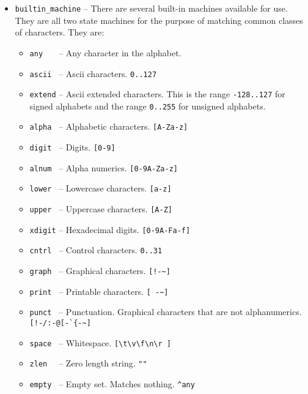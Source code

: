\documentclass[letterpaper,11pt,oneside]{book}
\begin{document}
\begin{itemize}
\item \verb|builtin_machine| -- There are several built-in machines available
for use. They are all two state machines for the purpose of matching common
classes of characters. They are:

\begin{itemize}

\item \verb|any   | -- Any character in the alphabet.

\item \verb|ascii | -- Ascii characters. \verb|0..127|

\item \verb|extend| -- Ascii extended characters. This is the range
\verb|-128..127| for signed alphabets and the range \verb|0..255| for unsigned
alphabets.

\item \verb|alpha | -- Alphabetic characters. \verb|[A-Za-z]|

\item \verb|digit | -- Digits. \verb|[0-9]|

\item \verb|alnum | -- Alpha numerics. \verb|[0-9A-Za-z]|

\item \verb|lower | -- Lowercase characters. \verb|[a-z]|

\item \verb|upper | -- Uppercase characters. \verb|[A-Z]|

\item \verb|xdigit| -- Hexadecimal digits. \verb|[0-9A-Fa-f]|

\item \verb|cntrl | -- Control characters. \verb|0..31|

\item \verb|graph | -- Graphical characters. \verb|[!-~]|

\item \verb|print | -- Printable characters. \verb|[ -~]|

\item \verb|punct | -- Punctuation. Graphical characters that are not alphanumerics.
\verb|[!-/:-@[-`{-~]|

\item \verb|space | -- Whitespace. \verb|[\t\v\f\n\r ]|

\item \verb|zlen  | -- Zero length string. \verb|""|

\item \verb|empty | -- Empty set. Matches nothing. \verb|^any|

\end{itemize}
\end{itemize}
\end{document}
